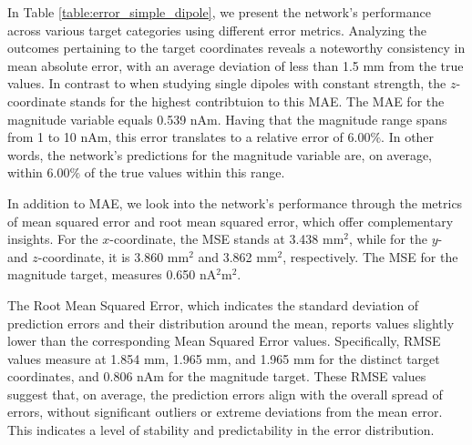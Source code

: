 \documentclass[a4paper, UKenglish, 11pt]{uiomaster}
\begin{document}


In Table \ref{table:error_simple_dipole}, we present the network's performance across various target categories using different error metrics. Analyzing the outcomes pertaining to the target coordinates reveals a noteworthy consistency in mean absolute error, with an average deviation of less than 1.5 mm from the true values. In contrast to when studying single dipoles with constant strength, the $z$-coordinate stands for the highest contribtuion to this MAE. The MAE for the magnitude variable equals 0.539 nAm. Having that the magnitude range spans from 1 to 10 nAm, this error translates to a relative error of 6.00$\%$. In other words, the network's predictions for the magnitude variable are, on average, within 6.00$\%$ of the true values within this range.

In addition to MAE, we look into the network's performance through the metrics of mean squared error and root mean squared error, which offer complementary insights. For the $x$-coordinate, the MSE stands at 3.438 mm$^2$, while for the $y$- and $z$-coordinate, it is 3.860 mm$^2$ and 3.862 mm$^2$, respectively. The MSE for the magnitude target, measures 0.650 nA$^2$m$^2$.

The Root Mean Squared Error, which indicates the standard deviation of prediction errors and their distribution around the mean, reports values slightly lower than the corresponding Mean Squared Error values. Specifically, RMSE values measure at 1.854 mm, 1.965 mm, and 1.965 mm for the distinct target coordinates, and 0.806 nAm for the magnitude target. These RMSE values suggest that, on average, the prediction errors align with the overall spread of errors, without significant outliers or extreme deviations from the mean error. This indicates a level of stability and predictability in the error distribution.
\end{document}
